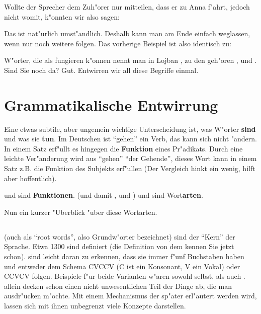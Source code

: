 Wollte der Sprecher dem Zuh"orer nur mitteilen, dass er zu Anna f"ahrt, jedoch nicht womit, k"onnten wir also sagen:
\begin{quote}
\end{quote}
Das ist nat"urlich umst"andlich. Deshalb kann man  am Ende einfach weglassen, wenn nur noch weitere  folgen. Das vorherige Beispiel ist also identisch zu:
\begin{quote}
\end{quote}

W"orter, die als  fungieren k"onnen nennt man in Lojban , zu den  geh"oren ,  und . Sind Sie noch da?
Gut. Entwirren wir all diese Begriffe einmal.

\section{Grammatikalische Entwirrung}
Eine etwas subtile, aber ungemein wichtige Unterscheidung ist, was W"orter \textbf{sind} und was sie \textbf{tun}. Im Deutschen ist ``gehen'' ein Verb, das kann sich nicht "andern.
In einem Satz erf"ullt es hingegen die \textbf{Funktion} eines Pr"adikats. Durch eine leichte Ver"anderung wird aus ``gehen'' ``der Gehende'', dieses Wort kann in einem Satz z.B. die
Funktion des Subjekts erf"ullen (Der Vergleich hinkt ein wenig, hilft aber hoffentlich).

 und  sind \textbf{Funktionen}.  (und damit ,  und ) und  sind Wort\textbf{arten}.

Nun ein kurzer "Uberblick "uber diese Wortarten.
\subsection{}
 (auch als ``root words'', also Grundw"orter bezeichnet) sind der ``Kern'' der Sprache. Etwa 1300 sind definiert (die Definition von dem  
kennen Sie jetzt schon).
 sind leicht daran zu erkennen, dass sie immer f"unf Buchstaben haben und entweder dem Schema CVCCV (C ist ein Konsonant, V ein Vokal) oder CCVCV folgen. Beispiele f"ur beide Varianten w"aren sowohl
 selbst, als auch .
 allein decken schon einen nicht unwesentlichen Teil der Dinge ab, die man ausdr"ucken m"ochte. Mit einem Mechanismus der sp"ater erl"autert werden wird, lassen sich mit
ihnen unbegrenzt viele Konzepte darstellen.

